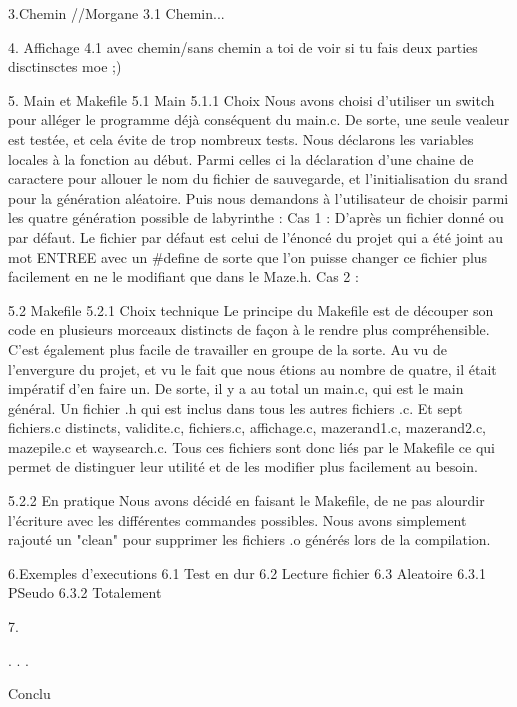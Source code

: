 3.Chemin //Morgane
3.1 Chemin...

4. Affichage 
4.1 avec chemin/sans chemin a toi de voir si tu fais deux parties disctinsctes moe ;)

5. Main et Makefile
5.1 Main
5.1.1 Choix
Nous avons choisi d'utiliser un switch pour alléger le programme déjà conséquent du main.c. De sorte, une seule vealeur est testée, et cela évite de trop nombreux tests. Nous déclarons les variables locales à la fonction au début. Parmi celles ci la déclaration d'une chaine de caractere pour allouer le nom du fichier de sauvegarde, et l'initialisation du srand pour la génération aléatoire.
Puis nous demandons à l'utilisateur de choisir parmi les quatre génération possible de labyrinthe :
Cas 1 : D'après un fichier donné ou par défaut.
Le fichier par défaut est celui de l'énoncé du projet qui a été joint au mot ENTREE avec un #define de sorte que l'on puisse changer ce fichier plus facilement en ne le modifiant que dans le Maze.h.
Cas 2 : 






5.2 Makefile
5.2.1 Choix technique
Le principe du Makefile est de découper son code en plusieurs morceaux distincts de façon à le rendre plus compréhensible.
C'est également plus facile de travailler en groupe de la sorte. 
Au vu de l'envergure du projet, et vu le fait que nous étions au nombre de quatre, il était impératif d'en faire un. 
De sorte, il y a au total un main.c, qui est le main général. Un fichier .h qui est inclus dans tous les autres fichiers .c.  
Et sept fichiers.c distincts, validite.c, fichiers.c, affichage.c, mazerand1.c, mazerand2.c, mazepile.c et waysearch.c.
Tous ces fichiers sont donc liés par le Makefile ce qui permet de distinguer leur utilité et de les modifier plus facilement au besoin.

5.2.2 En pratique
Nous avons décidé en faisant le Makefile, de ne pas alourdir l'écriture avec les différentes commandes possibles.
Nous avons simplement rajouté un "clean" pour supprimer les fichiers .o générés lors de la compilation. 



6.Exemples d'executions
6.1 Test en dur
6.2 Lecture fichier
6.3 Aleatoire
6.3.1 PSeudo
6.3.2 Totalement

7.


.
.
.

Conclu

